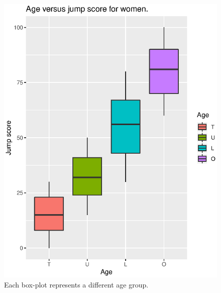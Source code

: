 \documentclass[runningheads]{llncs}
\begin{document}
\begin{figure}[h!]
\begin{multicols}{2}
    \includegraphics[width=\linewidth]{jumAgeWomen.eps} \vspace{-0.7cm} \caption{Each box-plot represents a different age group.} \label{jumAgeWomen} \par
    

\end{multicols}
\end{figure}
\end{document}
